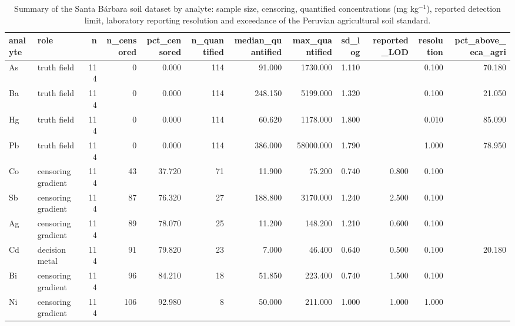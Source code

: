 \begin{table}[htbp]
\centering
\caption{Summary of the Santa Bárbara soil dataset by analyte: sample size, censoring, quantified concentrations (mg kg$^{-1}$), reported detection limit, laboratory reporting resolution and exceedance of the Peruvian agricultural soil standard.}
\label{tab:dataset}
\footnotesize
\begin{tabular}{llrrrrrrrrrr}
\toprule
analyte & role & n & n\_censored & pct\_censored & n\_quantified & median\_quantified & max\_quantified & sd\_log & reported\_LOD & resolution & pct\_above\_eca\_agri \\
\midrule
As & truth field & 114 & 0 & 0.000 & 114 & 91.000 & 1730.000 & 1.110 &  & 0.100 & 70.180 \\
Ba & truth field & 114 & 0 & 0.000 & 114 & 248.150 & 5199.000 & 1.320 &  & 0.100 & 21.050 \\
Hg & truth field & 114 & 0 & 0.000 & 114 & 60.620 & 1178.000 & 1.800 &  & 0.010 & 85.090 \\
Pb & truth field & 114 & 0 & 0.000 & 114 & 386.000 & 58000.000 & 1.790 &  & 1.000 & 78.950 \\
Co & censoring gradient & 114 & 43 & 37.720 & 71 & 11.900 & 75.200 & 0.740 & 0.800 & 0.100 &  \\
Sb & censoring gradient & 114 & 87 & 76.320 & 27 & 188.800 & 3170.000 & 1.240 & 2.500 & 0.100 &  \\
Ag & censoring gradient & 114 & 89 & 78.070 & 25 & 11.200 & 148.200 & 1.210 & 0.600 & 0.100 &  \\
Cd & decision metal & 114 & 91 & 79.820 & 23 & 7.000 & 46.400 & 0.640 & 0.500 & 0.100 & 20.180 \\
Bi & censoring gradient & 114 & 96 & 84.210 & 18 & 51.850 & 223.400 & 0.740 & 1.500 & 0.100 &  \\
Ni & censoring gradient & 114 & 106 & 92.980 & 8 & 50.000 & 211.000 & 1.000 & 1.000 & 1.000 &  \\
\bottomrule
\end{tabular}
\end{table}
